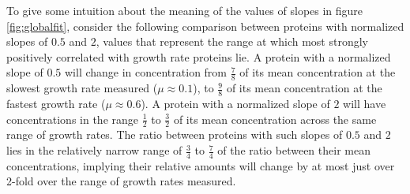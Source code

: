 To give some intuition about the meaning of the values of slopes in figure \ref{fig:globalfit}, consider the following comparison between proteins with normalized slopes of $0.5$ and $2$, values that represent the range at which most strongly positively correlated with growth rate proteins lie.
A protein with a normalized slope of $0.5$ will change in concentration from $\frac{7}{8}$ of its mean concentration at the slowest growth rate measured ($\mu \approx 0.1$), to $\frac{9}{8}$ of its mean concentration at the fastest growth rate ($\mu \approx 0.6$).
A protein with a normalized slope of $2$ will have concentrations in the range $\frac{1}{2}$ to $\frac{3}{2}$ of its mean concentration across the same range of growth rates.
The ratio between proteins with such slopes of $0.5$ and $2$ lies in the relatively narrow range of $\frac{3}{4}$ to $\frac{7}{4}$ of the ratio between their mean concentrations, implying their relative amounts will change by at most just over 2-fold over the range of growth rates measured.